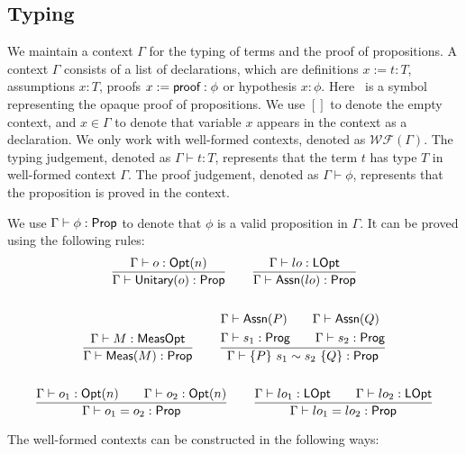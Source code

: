 \subsection{Typing}

\newcommand{\WF}[1]{\ensuremath{\mathcal{WF}(#1)}}

We maintain a context $\Gamma$ for the typing of terms and the proof of propositions. 
A context $\Gamma$ consists of a list of declarations, which are definitions $x := t : T$, assumptions $x : T$, proofs $x := \textsf{proof} : \phi$ or hypothesis $x : \phi$. 
Here \pf\ is a symbol representing the opaque proof of propositions.
We use $[]$ to denote the empty context, and $x \in \Gamma$ to denote that variable $x$ appears in the context as a declaration.
We only work with well-formed contexts, denoted as \WF{\Gamma}. 
The typing judgement, denoted as $\Gamma \vdash t : T$, represents that the term $t$ has type $T$ in well-formed context $\Gamma$. 
The proof judgement, denoted as $\Gamma \vdash \phi$, represents that the proposition is proved in the context.

We use $\Gamma \vdash \phi : \textsf{Prop}$ to denote that $\phi$ is a valid proposition in $\Gamma$. It can be proved using the following rules:
\begin{gather*}
    \frac{\Gamma \vdash o : \textsf{Opt}(n)}{\Gamma \vdash \textsf{Unitary}({o}) : \textsf{Prop}}
    \qquad
    \frac{\Gamma \vdash lo : \textsf{LOpt}}{\Gamma \vdash \textsf{Assn}(lo) : \textsf{Prop}} \\
    \\
    \frac{\Gamma \vdash M : \textsf{MeasOpt}}{\Gamma \vdash \textsf{Meas}(M) : \textsf{Prop}}
    \qquad
    \frac{
        \begin{aligned}
            & \Gamma \vdash \textsf{Assn}(P) \qquad \Gamma \vdash \textsf{Assn}(Q) \\
            & \Gamma \vdash s_1 : \textsf{Prog} \qquad \Gamma \vdash s_2 : \textsf{Prog}
        \end{aligned}}
        {
            \Gamma \vdash \{P\}~s_1 \sim s_2~\{Q\} : \textsf{Prop}
        } \\
    \\
    \frac{\Gamma \vdash o_1 : \textsf{Opt}(n) \qquad \Gamma \vdash o_2 : \textsf{Opt}(n)}{\Gamma \vdash o_1 = o_2 : \textsf{Prop}}
    \qquad
    \frac{\Gamma \vdash lo_1 : \textsf{LOpt} \qquad \Gamma \vdash lo_2 : \textsf{LOpt}}{\Gamma \vdash lo_1 = lo_2 : \textsf{Prop}}
\end{gather*}

The well-formed contexts can be constructed in the following ways:

